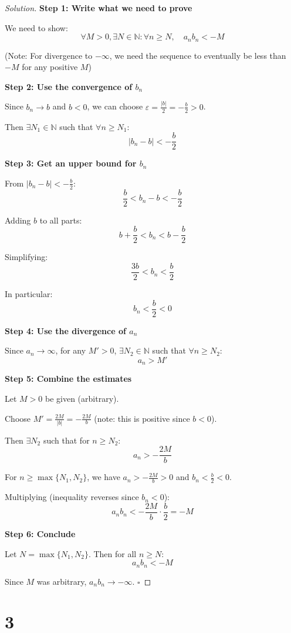 \documentclass[12pt,a4paper]{article}
\theoremstyle{definition}
\theoremstyle{remark}
\newenvironment{solution}{\begin{proof}[Solution]}{\end{proof}}
\begin{document}
\begin{solution}
\textbf{Step 1: Write what we need to prove}

We need to show:
\[
\forall M > 0, \exists N \in \mathbb{N} : \forall n \geq N, \quad a_n b_n < -M
\]

(Note: For divergence to $-\infty$, we need the sequence to eventually be less than $-M$ for any positive $M$)

\textbf{Step 2: Use the convergence of $b_n$}

Since $b_n \to b$ and $b < 0$, we can choose $\varepsilon = \frac{|b|}{2} = -\frac{b}{2} > 0$.

Then $\exists N_1 \in \mathbb{N}$ such that $\forall n \geq N_1$:
\[
|b_n - b| < -\frac{b}{2}
\]

\textbf{Step 3: Get an upper bound for $b_n$}

From $|b_n - b| < -\frac{b}{2}$:
\[
\frac{b}{2} < b_n - b < -\frac{b}{2}
\]

Adding $b$ to all parts:
\[
b + \frac{b}{2} < b_n < b - \frac{b}{2}
\]

Simplifying:
\[
\frac{3b}{2} < b_n < \frac{b}{2}
\]

In particular:
\[
b_n < \frac{b}{2} < 0
\]

\textbf{Step 4: Use the divergence of $a_n$}

Since $a_n \to \infty$, for any $M' > 0$, $\exists N_2 \in \mathbb{N}$ such that $\forall n \geq N_2$:
\[
a_n > M'
\]

\textbf{Step 5: Combine the estimates}

Let $M > 0$ be given (arbitrary).

Choose $M' = \frac{2M}{|b|} = -\frac{2M}{b}$ (note: this is positive since $b < 0$).

Then $\exists N_2$ such that for $n \geq N_2$:
\[
a_n > -\frac{2M}{b}
\]

For $n \geq \max\{N_1, N_2\}$, we have $a_n > -\frac{2M}{b} > 0$ and $b_n < \frac{b}{2} < 0$.

Multiplying (inequality reverses since $b_n < 0$):
\[
a_n b_n < -\frac{2M}{b} \cdot \frac{b}{2} = -M
\]

\textbf{Step 6: Conclude}

Let $N = \max\{N_1, N_2\}$. Then for all $n \geq N$:
\[
a_n b_n < -M
\]

Since $M$ was arbitrary, $a_n b_n \to -\infty$. $\square$
\end{solution}



\section*{3}
\end{document}
